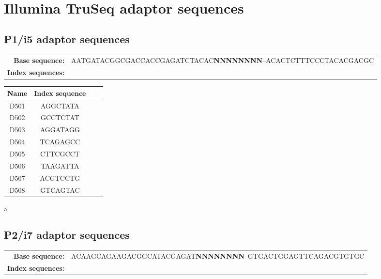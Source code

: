 \newpage
\section{Illumina TruSeq adaptor sequences}
\label{app:oligos_illumina}

\subsection*{P1/i5 adaptor sequences}

\begin{tabular}{rm{10cm}}
\textbf{Base sequence:} & AATGATACGGCGACCACCGAGATCTACAC\textbf{NNNNNNNN}--ACACTCTTTCCCTACACGACGC\\
\textbf{Index sequences:} & \\
\end{tabular}\vspace{-2ex}

\begin{center}
\begin{threeparttable}
\begin{tabular}{cccc}\toprule
\textbf{Name} & \textbf{Index sequence}\tnote{a}\\\midrule
D501 & AGGCTATA\\
D502 & GCCTCTAT\\
D503 & AGGATAGG\\
D504 & TCAGAGCC\\
D505 & CTTCGCCT\\
D506 & TAAGATTA\\
D507 & ACGTCCTG\\
D508 & GTCAGTAC\\
\bottomrule
\end{tabular}
\begin{tablenotes}
\item[a] \parencite{illumina2018adapters}
\end{tablenotes}
\end{threeparttable}
\end{center}

\subsection*{P2/i7 adaptor sequences}

\begin{tabular}{rm{10cm}}
\textbf{Base sequence:} & ACAAGCAGAAGACGGCATACGAGAT\textbf{NNNNNNNN}--GTGACTGGAGTTCAGACGTGTGC\\
\textbf{Index sequences:} & \\
\end{tabular}\vspace{-2ex}

